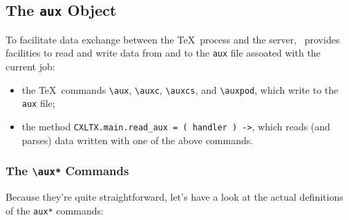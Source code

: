 








\subsection{The \texttt{aux} Object}\label{aux}

To facilitate data exchange between the \TeX\ process and the server, \CXLTX\ provides facilities
to read and write data from and to the \verb#aux# file assoated with the current job:

\begin{itemize}
\item
  the \TeX\ commands \verb#\aux#, \verb#\auxc#, \verb#\auxcs#, and \verb#\auxpod#, which write to the
  \verb#aux# file;
\item
  the method \verb#CXLTX.main.read_aux = ( handler ) ->#, which reads (and parses) data written with one of
  the above commands.
\end{itemize}

\subsubsection{The \texttt{\textbackslash{}aux*} Commands}\label{auxcommands}

Because they're quite straightforward, let's have a look at the actual definitions of the
\verb#aux*# commands:

